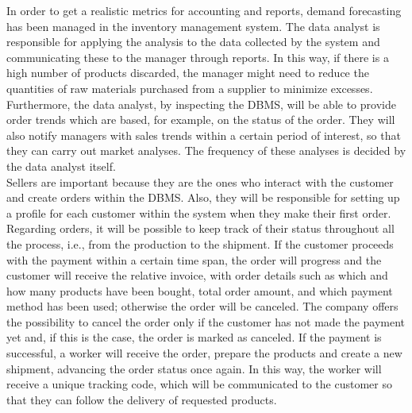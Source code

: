 In order to get a realistic metrics for accounting and reports, demand forecasting has been managed in the inventory management system. The data analyst is responsible for applying the analysis to the data collected by the system and communicating these to the manager through reports. In this way, if there is a high number of products discarded, the manager might need to reduce the quantities of raw materials purchased from a supplier to minimize excesses. Furthermore, the data analyst, by inspecting the DBMS, will be able to provide order trends which are based, for example, on the status of the order. They will also notify managers with sales trends within a certain period of interest, so that they can carry out market analyses. The frequency of these analyses is decided by the data analyst itself.\\

Sellers are important because they are the ones who interact with the customer and create orders within the DBMS. Also, they will be responsible for setting up a profile for each customer within the system when they make their first order. Regarding orders, it will be possible to keep track of their status throughout all the process, i.e., from the production to the shipment. If the customer proceeds with the payment within a certain time span, the order will progress and the customer will receive the relative invoice, with order details such as which and how many products have been bought, total order amount, and which payment method has been used; otherwise the order will be canceled. The company offers the possibility to cancel the order only if the customer has not made the payment yet and, if this is the case, the order is marked as canceled. If the payment is successful, a worker will receive the order, prepare the products and create a new shipment, advancing the order status once again. In this way, the worker will receive a unique tracking code, which will be communicated to the customer so that they can follow the delivery of requested products. \\

